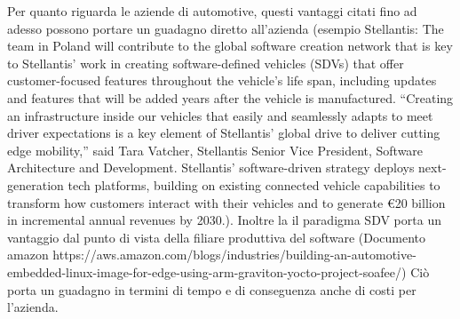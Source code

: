 Per quanto riguarda le aziende di automotive, questi vantaggi citati fino ad adesso possono portare un guadagno diretto all'azienda (esempio Stellantis: The team in Poland will contribute to the global software creation network that is key to Stellantis' work in creating software-defined vehicles (SDVs) that offer customer-focused features throughout the vehicle's life span, including updates and features that will be added years after the vehicle is manufactured. “Creating an infrastructure inside our vehicles that easily and seamlessly adapts to meet driver expectations is a key element of Stellantis' global drive to deliver cutting edge mobility,” said Tara Vatcher, Stellantis Senior Vice President, Software Architecture and Development. Stellantis' software-driven strategy deploys next-generation tech platforms, building on existing connected vehicle capabilities to transform how customers interact with their vehicles and to generate €20 billion in incremental annual revenues by 2030.).
Inoltre la il paradigma SDV porta un vantaggio dal punto di vista della filiare produttiva del software (Documento amazon https://aws.amazon.com/blogs/industries/building-an-automotive-embedded-linux-image-for-edge-using-arm-graviton-yocto-project-soafee/)
Ciò porta un guadagno in termini di tempo e di conseguenza anche di costi per l'azienda.
